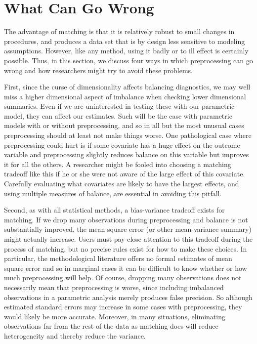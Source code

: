 \documentclass[11pt,titlepage]{article}
\begin{document}
\section{What Can Go Wrong}

The advantage of matching is that it is relatively robust to small
changes in procedures, and produces a data set that is by design less
sensitive to modeling assumptions.  However, like any method, using it
badly or to ill effect is certainly possible.  Thus, in this section,
we discuss four ways in which preprocessing can go wrong and how
researchers might try to avoid these problems.

First, since the curse of dimensionality affects balancing
diagnostics, we may well miss a higher dimensional aspect of imbalance
when checking lower dimensional summaries.  Even if we are
uninterested in testing these with our parametric model, they can
affect our estimates.  Such will be the case with parametric models
with or without preprocessing, and so in all but the most unusual
cases preprocessing should at least not make things worse.  One
pathological case where preprocessing could hurt is if some covariate
has a huge effect on the outcome variable and preprocessing slightly
reduces balance on this variable but improves it for all the others.
A researcher might be fooled into choosing a matching tradeoff like
this if he or she were not aware of the large effect of this
covariate.  Carefully evaluating what covariates are likely to have
the largest effects, and using multiple measures of balance, are
essential in avoiding this pitfall.

Second, as with all statistical methods, a bias-variance tradeoff
exists for matching.  If we drop many observations during
preprocessing and balance is not substantially improved, the mean
square error (or other mean-variance summary) might actually increase.
Users must pay close attention to this tradeoff during the process of
matching, but no precise rules exist for how to make these choices.
In particular, the methodological literature offers no formal
estimates of mean square error and so in marginal cases it can be
difficult to know whether or how much preprocessing will help.  Of
course, dropping many observations does not necessarily mean that
preprocessing is worse, since including imbalanced observations in a
parametric analysis merely produces false precision.  So although
estimated standard errors may increase in some cases with
preprocessing, they would likely be more accurate.  Moreover, in many
situations, eliminating observations far from the rest of the data as
matching does will reduce heterogeneity and thereby reduce the
variance.
\end{document}
